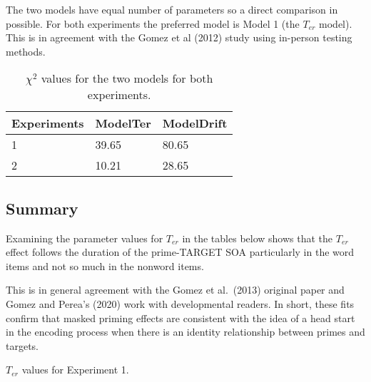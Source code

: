 \documentclass[
  english,
  man]{apa6}
\begin{document}
\begin{appendix}
The two models have equal number of parameters so a direct comparison in
possible. For both experiments the preferred model is Model 1 (the
\(T_{er}\) model). This is in agreement with the Gomez et al (2012)
study using in-person testing methods.

\begin{table}[tbp]

\begin{center}
\begin{threeparttable}

\caption{\label{tab:model_parameters_table}$\chi^2$ values for the two models for both experiments.}

\begin{tabular}{lll}
\toprule
Experiments & \multicolumn{1}{c}{ModelTer} & \multicolumn{1}{c}{ModelDrift}\\
\midrule
1 & 39.65 & 80.65\\
2 & 10.21 & 28.65\\
\bottomrule
\end{tabular}

\end{threeparttable}
\end{center}

\end{table}

\hypertarget{summary}{%
\subsection{Summary}\label{summary}}

Examining the parameter values for \(T_{er}\) in the tables below shows
that the \(T_{er}\) effect follows the duration of the prime-TARGET SOA
particularly in the word items and not so much in the nonword items.

This is in general agreement with the Gomez et al.~(2013) original paper
and Gomez and Perea's (2020) work with developmental readers. In short,
these fits confirm that masked priming effects are consistent with the
idea of a head start in the encoding process when there is an identity
relationship between primes and targets.

\begin{table}[tbp]

\begin{center}
\begin{threeparttable}

\caption{\label{tab:appendix_table_2}$T_{er}$ values for Experiment 1.}


\end{threeparttable}
\end{center}
\end{table}
\end{appendix}
\end{document}
